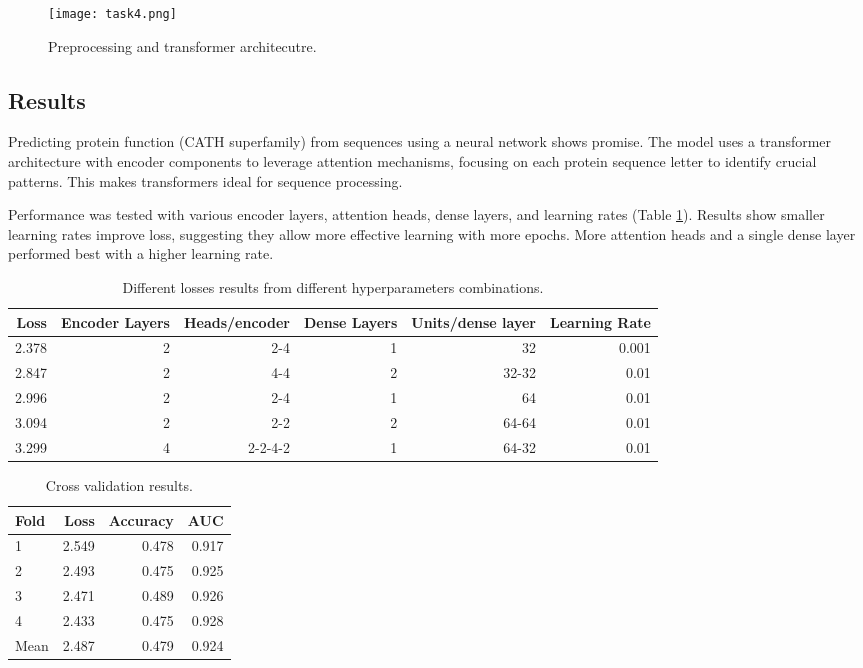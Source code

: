 \documentclass[a4paper,12pt]{article}
\begin{document}
\begin{figure}[h]
  \centering
  \texttt{[image: task4.png]}
  \caption{Preprocessing and transformer architecutre.}
  \label{fig:pipeline-4}
\end{figure}



\subsection{Results}



Predicting protein function (CATH superfamily) from sequences using a neural network shows promise. The model uses a transformer architecture with encoder components to leverage attention mechanisms, focusing on each protein sequence letter to identify crucial patterns. This makes transformers ideal for sequence processing.

Performance was tested with various encoder layers, attention heads, dense layers, and learning rates (Table \ref{tab:losses-hyperparameters-4}). Results show smaller learning rates improve loss, suggesting they allow more effective learning with more epochs. More attention heads and a single dense layer performed best with a higher learning rate.


\begin{table}[h]
\centering
\begin{tabular}{r|rrrrr}
\toprule
Loss & Encoder Layers & Heads/encoder & Dense Layers & Units/dense layer & Learning Rate\\
\midrule
2.378  & 2 & 2-4 & 1 & 32 & 0.001\\
2.847  & 2 & 4-4 & 2 & 32-32 & 0.01\\
2.996  & 2 & 2-4 & 1 & 64 & 0.01 \\
3.094  & 2 & 2-2 & 2 & 64-64 & 0.01 \\
3.299  & 4 & 2-2-4-2 & 1 & 64-32  & 0.01\\
\bottomrule
\end{tabular}
\caption{
    Different losses results from different hyperparameters combinations.
}
\label{tab:losses-hyperparameters-4}
\end{table}

\begin{table}[h]
\centering
\begin{tabular}{lrrr}
\toprule
Fold & Loss & Accuracy & AUC \\
\midrule
 1 & 2.549 & 0.478 & 0.917 \\
 2 & 2.493 & 0.475 & 0.925 \\
 3 & 2.471 & 0.489 & 0.926 \\
 4 & 2.433 & 0.475 & 0.928 \\
\cmidrule{1-4}
Mean & 2.487 & 0.479 & 0.924 \\
\bottomrule
\end{tabular}
\caption{
    Cross validation results.
}
\label{tab:cross-validation-4}
\end{table}
\end{document}
